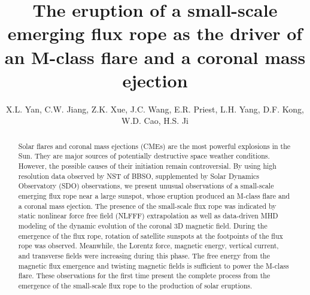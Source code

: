 \documentclass[12pt,preprint]{aastex}
\begin{document}
\begin{CJK*}{UTF8}{gbsn}

\title{The eruption of a small-scale emerging flux rope as the driver of an M-class flare and a coronal mass ejection}
\author{X.L. Yan, C.W. Jiang, Z.K. Xue, J.C. Wang, E.R. Priest, L.H. Yang, D.F. Kong, W.D. Cao, H.S. Ji}



\begin{abstract}
Solar flares and coronal mass ejections (CMEs) are the most powerful explosions in the Sun. They are major sources of potentially destructive space weather conditions. However, the possible causes of their initiation remain controversial. By using high resolution data observed by NST of BBSO, supplemented by Solar Dynamics Observatory (SDO) observations, we present unusual observations of a small-scale emerging flux rope near a large sunspot, whose eruption produced an M-class flare and a coronal mass ejection. The presence of the small-scale flux rope was indicated by static nonlinear force free field (NLFFF) extrapolation as well as data-driven MHD modeling of the dynamic evolution of the coronal 3D magnetic field. During the emergence of the flux rope, rotation of satellite sunspots at the footpoints of the flux rope was observed. Meanwhile, the Lorentz force, magnetic energy,  vertical current, and transverse fields were increasing during this phase. The free energy from the magnetic flux emergence and twisting magnetic fields is sufficient to power the M-class flare. These observations for the first time present the complete process from the emergence of the small-scale flux rope to the production of solar eruptions.


\end{abstract}
\end{CJK*}
\end{document}
